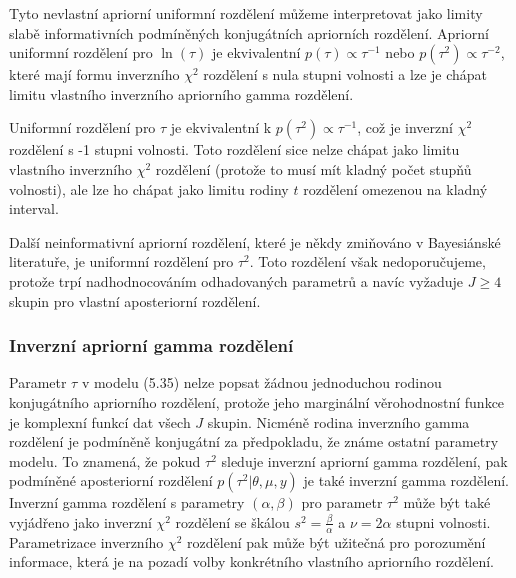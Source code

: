 Tyto nevlastní apriorní uniformní rozdělení můžeme interpretovat jako limity slabě informativních podmíněných konjugátních apriorních rozdělení. Apriorní uniformní rozdělení pro $\ln(\tau)$ je ekvivalentní $p(\tau) \varpropto \tau^{-1}$ nebo $p(\tau^2) \varpropto \tau^{-2}$, které mají formu inverzního $\chi^2$ rozdělení s nula stupni volnosti a lze je chápat limitu vlastního inverzního apriorního gamma rozdělení.

Uniformní rozdělení pro $\tau$ je ekvivalentní k $p(\tau^2) \varpropto \tau^{-1}$, což je inverzní $\chi^2$ rozdělení s -1 stupni volnosti. Toto rozdělení sice nelze chápat jako limitu vlastního inverzního $\chi^2$ rozdělení (protože to musí mít kladný počet stupňů volnosti), ale lze ho chápat jako limitu rodiny $t$ rozdělení omezenou na kladný interval.

Další neinformativní apriorní rozdělení, které je někdy zmiňováno v Bayesiánské literatuře, je uniformní rozdělení pro $\tau^2$. Toto rozdělení však nedoporučujeme, protože trpí nadhodnocováním odhadovaných parametrů a navíc vyžaduje $J \ge 4$ skupin pro vlastní aposteriorní rozdělení.

\subsubsection{Inverzní apriorní gamma rozdělení}

Parametr $\tau$ v modelu (5.35) nelze popsat žádnou jednoduchou rodinou konjugátního apriorního rozdělení, protože jeho marginální věrohodnostní funkce je komplexní funkcí dat všech $J$ skupin. Nicméně rodina inverzního gamma rozdělení je podmíněně konjugátní za předpokladu, že známe ostatní parametry modelu. To znamená, že pokud $\tau^2$ sleduje inverzní apriorní gamma rozdělení, pak podmíněné aposteriorní rozdělení $p(\tau^2 | \theta, \mu, y)$ je také inverzní gamma rozdělení. Inverzní gamma rozdělení s parametry $(\alpha, \beta)$ pro parametr $\tau^2$ může být také vyjádřeno jako inverzní $\chi^2$ rozdělení se škálou $s^2 = \frac{\beta}{\alpha}$ a $\nu = 2 \alpha$ stupni volnosti. Parametrizace inverzního $\chi^2$ rozdělení pak může být užitečná pro porozumění informace, která je na pozadí volby konkrétního vlastního apriorního rozdělení.

